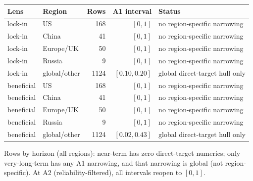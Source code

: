 \scriptsize
\begin{tabular}{llrrl}
\toprule
Lens & Region & Rows & A1 interval & Status \\
\midrule
lock-in & US & 168 & $[0, 1]$ & no region-specific narrowing \\
lock-in & China & 41 & $[0, 1]$ & no region-specific narrowing \\
lock-in & Europe/UK & 50 & $[0, 1]$ & no region-specific narrowing \\
lock-in & Russia & 9 & $[0, 1]$ & no region-specific narrowing \\
lock-in & global/other & 1124 & $[0.10, 0.20]$ & global direct-target hull only \\
\midrule
beneficial & US & 168 & $[0, 1]$ & no region-specific narrowing \\
beneficial & China & 41 & $[0, 1]$ & no region-specific narrowing \\
beneficial & Europe/UK & 50 & $[0, 1]$ & no region-specific narrowing \\
beneficial & Russia & 9 & $[0, 1]$ & no region-specific narrowing \\
beneficial & global/other & 1124 & $[0.02, 0.43]$ & global direct-target hull only \\
\bottomrule
\end{tabular}

\medskip\noindent
\scriptsize
Rows by horizon (all regions): near-term has zero direct-target
numerics; only very-long-term has any A1 narrowing, and that
narrowing is global (not region-specific).  At A2 (reliability-filtered),
all intervals reopen to $[0,1]$.
